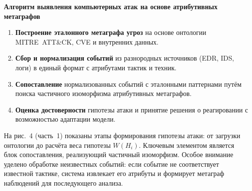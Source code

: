 \documentclass[12pt,a4paper]{extarticle}
\begin{document}
\textbf{Алгоритм выявления компьютерных атак на основе атрибутивных метаграфов}
\begin{enumerate}[leftmargin=*, label=\arabic*.]
    \item \textbf{Построение эталонного метаграфа угроз} на основе онтологии MITRE~ATT\&CK, CVE и внутренних данных.
    \item \textbf{Сбор и нормализация событий} из разнородных источников (EDR, IDS, логи) в единый формат с атрибутами тактик и техник.
    \item \textbf{Сопоставление} нормализованных событий с эталонными паттернами путём поиска частичного изоморфизма атрибутивных метаграфов.
    \item \textbf{Оценка достоверности} гипотезы атаки и принятие решения о реагировании с возможностью адаптации модели.
\end{enumerate}

На рис.~4 (часть~1) показаны этапы формирования гипотезы атаки: от загрузки онтологии до расчёта веса гипотезы \(W(H_i)\). Ключевым элементом является блок сопоставления, реализующий частичный изоморфизм. Особое внимание уделено обработке неизвестных событий: если событие не соответствует известной тактике, система извлекает его атрибуты и формирует метаграф наблюдений для последующего анализа.
\end{document}
